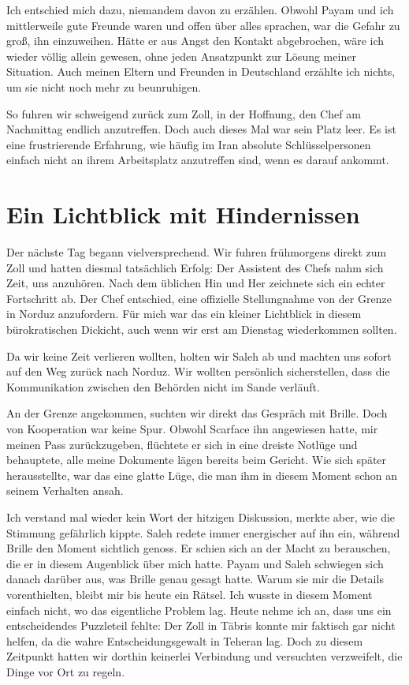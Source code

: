 Ich entschied mich dazu, niemandem davon zu erzählen. Obwohl Payam und ich mittlerweile gute Freunde waren und offen über alles sprachen, war die Gefahr zu groß, ihn einzuweihen. Hätte er aus Angst den Kontakt abgebrochen, wäre ich wieder völlig allein gewesen, ohne jeden Ansatzpunkt zur Lösung meiner Situation. Auch meinen Eltern und Freunden in Deutschland erzählte ich nichts, um sie nicht noch mehr zu beunruhigen.

So fuhren wir schweigend zurück zum Zoll, in der Hoffnung, den Chef am Nachmittag endlich anzutreffen. Doch auch dieses Mal war sein Platz leer. Es ist eine frustrierende Erfahrung, wie häufig im Iran absolute Schlüsselpersonen einfach nicht an ihrem Arbeitsplatz anzutreffen sind, wenn es darauf ankommt.

\chapter*{Ein Lichtblick mit Hindernissen}

Der nächste Tag begann vielversprechend. Wir fuhren frühmorgens direkt zum Zoll und hatten diesmal tatsächlich Erfolg: Der Assistent des Chefs nahm sich Zeit, uns anzuhören. Nach dem üblichen Hin und Her zeichnete sich ein echter Fortschritt ab. Der Chef entschied, eine offizielle Stellungnahme von der Grenze in Norduz anzufordern. Für mich war das ein kleiner Lichtblick in diesem bürokratischen Dickicht, auch wenn wir erst am Dienstag wiederkommen sollten.

Da wir keine Zeit verlieren wollten, holten wir Saleh ab und machten uns sofort auf den Weg zurück nach Norduz. Wir wollten persönlich sicherstellen, dass die Kommunikation zwischen den Behörden nicht im Sande verläuft.

An der Grenze angekommen, suchten wir direkt das Gespräch mit Brille. Doch von Kooperation war keine Spur. Obwohl Scarface ihn angewiesen hatte, mir meinen Pass zurückzugeben, flüchtete er sich in eine dreiste Notlüge und behauptete, alle meine Dokumente lägen bereits beim Gericht. Wie sich später herausstellte, war das eine glatte Lüge, die man ihm in diesem Moment schon an seinem Verhalten ansah.

Ich verstand mal wieder kein Wort der hitzigen Diskussion, merkte aber, wie die Stimmung gefährlich kippte. Saleh redete immer energischer auf ihn ein, während Brille den Moment sichtlich genoss. Er schien sich an der Macht zu berauschen, die er in diesem Augenblick über mich hatte. Payam und Saleh schwiegen sich danach darüber aus, was Brille genau gesagt hatte. Warum sie mir die Details vorenthielten, bleibt mir bis heute ein Rätsel. Ich wusste in diesem Moment einfach nicht, wo das eigentliche Problem lag. Heute nehme ich an, dass uns ein entscheidendes Puzzleteil fehlte: Der Zoll in Täbris konnte mir faktisch gar nicht helfen, da die wahre Entscheidungsgewalt in Teheran lag. Doch zu diesem Zeitpunkt hatten wir dorthin keinerlei Verbindung und versuchten verzweifelt, die Dinge vor Ort zu regeln.

